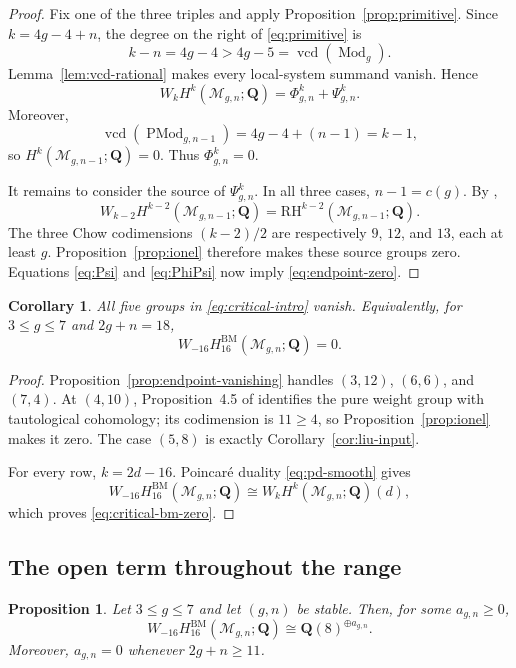 \documentclass[12pt,reqno]{amsart}
\newcommand{\Q}{\mathbf{Q}}
\newcommand{\M}{\mathcal{M}}
\newcommand{\BM}{\mathrm{BM}}
\newcommand{\RH}{\mathrm{RH}}
\newcommand{\Mod}{\operatorname{Mod}}
\newcommand{\PMod}{\operatorname{PMod}}
\newcommand{\vcd}{\operatorname{vcd}}
\newtheorem{proposition}[theorem]{Proposition}
\newtheorem{corollary}[theorem]{Corollary}
\theoremstyle{definition}
\theoremstyle{remark}
\begin{document}
\begin{proof}
Fix one of the three triples and apply
Proposition~\ref{prop:primitive}.  Since $k=4g-4+n$, the degree on the
right of \eqref{eq:primitive} is
\[
 k-n=4g-4>4g-5=\vcd(\Mod_g).
\]
Lemma~\ref{lem:vcd-rational} makes every local-system summand vanish.
Hence
\begin{equation}\label{eq:PhiPsi}
 W_kH^k(\M_{g,n};\Q)=\Phi^k_{g,n}+\Psi^k_{g,n}.
\end{equation}
Moreover,
\[
 \vcd(\PMod_{g,n-1})=4g-4+(n-1)=k-1,
\]
so $H^k(\M_{g,n-1};\Q)=0$.  Thus $\Phi^k_{g,n}=0$.

It remains to consider the source of $\Psi^k_{g,n}$.  In all three cases,
$n-1=c(g)$.  By \cite[Table~1, Lemma~4.3, and
Proposition~4.5]{CLP},
\[
 W_{k-2}H^{k-2}(\M_{g,n-1};\Q)
 =\RH^{k-2}(\M_{g,n-1};\Q).
\]
The three Chow codimensions $(k-2)/2$ are respectively $9$, $12$, and
$13$, each at least $g$.  Proposition~\ref{prop:ionel} therefore makes
these source groups zero.  Equations \eqref{eq:Psi} and \eqref{eq:PhiPsi}
now imply \eqref{eq:endpoint-zero}.
\end{proof}

\begin{corollary}\label{cor:critical-vanishing}
All five groups in \eqref{eq:critical-intro} vanish.  Equivalently, for
$3\leq g\leq7$ and $2g+n=18$,
\begin{equation}\label{eq:critical-bm-zero}
 W_{-16}H^{\BM}_{16}(\M_{g,n};\Q)=0.
\end{equation}
\end{corollary}

\begin{proof}
Proposition~\ref{prop:endpoint-vanishing} handles $(3,12)$, $(6,6)$, and
$(7,4)$.  At $(4,10)$, Proposition~4.5 of \cite{CLP} identifies the pure
weight group with tautological cohomology; its codimension is $11\geq4$, so
Proposition~\ref{prop:ionel} makes it zero.  The case $(5,8)$ is exactly
Corollary~\ref{cor:liu-input}.

For every row, $k=2d-16$.  Poincar\'e duality \eqref{eq:pd-smooth} gives
\[
 W_{-16}H^{\BM}_{16}(\M_{g,n};\Q)
 \cong W_kH^k(\M_{g,n};\Q)(d),
\]
which proves \eqref{eq:critical-bm-zero}.
\end{proof}

\subsection{The open term throughout the range}

\begin{proposition}\label{prop:open-all}
Let $3\leq g\leq7$ and let $(g,n)$ be stable.  Then, for some
$a_{g,n}\geq0$,
\begin{equation}\label{eq:open-all}
 W_{-16}H_{16}^{\BM}(\M_{g,n};\Q)
 \cong\Q(8)^{\oplus a_{g,n}}.
\end{equation}
Moreover, $a_{g,n}=0$ whenever $2g+n\geq11$.
\end{proposition}
\end{document}
